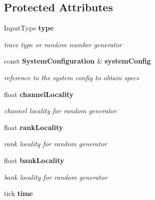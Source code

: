 \subsection*{Protected Attributes}
\begin{CompactItemize}
\item 
InputType {\bf type}\label{class_d_r_a_msim_i_i_1_1_input_stream_c5a32f755985849b47a327fbb2fc1421}

\begin{CompactList}\small\item\em trace type or random number generator \item\end{CompactList}\item 
const {\bf SystemConfiguration} \& {\bf systemConfig}\label{class_d_r_a_msim_i_i_1_1_input_stream_1bec6d2f4dca9a84cd862f32f2ea77ef}

\begin{CompactList}\small\item\em reference to the system config to obtain specs \item\end{CompactList}\item 
float {\bf channelLocality}\label{class_d_r_a_msim_i_i_1_1_input_stream_9fdc332fc5d5e387f533f680315c2373}

\begin{CompactList}\small\item\em channel locality for random generator \item\end{CompactList}\item 
float {\bf rankLocality}\label{class_d_r_a_msim_i_i_1_1_input_stream_e35ef6c1f6dc8114cd1f8e306ea777c8}

\begin{CompactList}\small\item\em rank locality for random generator \item\end{CompactList}\item 
float {\bf bankLocality}\label{class_d_r_a_msim_i_i_1_1_input_stream_32e8784fa538cf246cdd3bda6c4d595c}

\begin{CompactList}\small\item\em bank locality for random generator \item\end{CompactList}\item 
tick {\bf time}\label{class_d_r_a_msim_i_i_1_1_input_stream_11d607bf05a648e76d23935dab66fcb1}


\end{CompactItemize}
